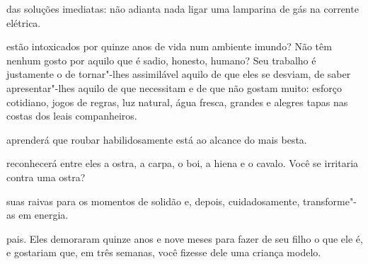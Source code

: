  das soluções imediatas: não adianta nada ligar uma lamparina
de gás na corrente elétrica.

\bigskip
\bigskip


\pagebreak


 estão intoxicados por quinze anos de vida num ambiente imundo? Não
têm nenhum gosto por aquilo que é sadio, honesto, humano? Seu trabalho é
justamente o de tornar"-lhes assimilável aquilo de que eles se desviam,
de saber apresentar"-lhes aquilo de que necessitam e de que não gostam
muito: esforço cotidiano, jogos de regras, luz natural, água fresca,
grandes e alegres tapas nas costas dos leais companheiros.

\bigskip
\bigskip

 aprenderá que roubar habilidosamente está ao alcance do mais besta.

\bigskip
\bigskip

 reconhecerá entre eles a ostra, a carpa, o boi, a hiena e o cavalo.
Você se irritaria contra uma ostra?

\bigskip
\bigskip

 suas raivas para os momentos de solidão e, depois, cuidadosamente,
transforme"-as em energia.

\bigskip
\bigskip

 pais. Eles demoraram quinze anos e nove meses para fazer de seu filho
o que ele é, e gostariam que, em três semanas, você fizesse dele uma
criança modelo.

\bigskip
\bigskip

\pagebreak
\thispagestyle{empty}

